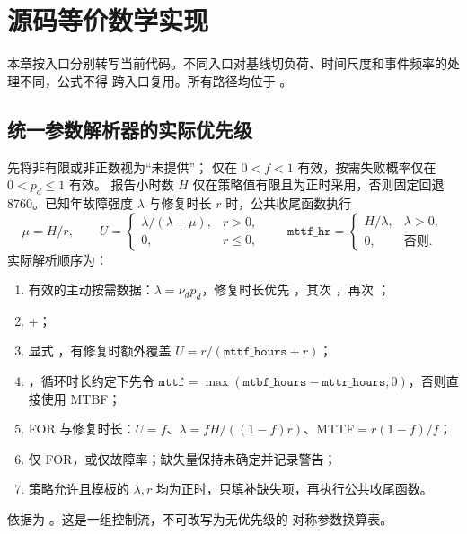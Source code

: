 \section{源码等价数学实现}\label{sec:rel-source-model}

本章按入口分别转写当前代码。不同入口对基线切负荷、时间尺度和事件频率的处理不同，公式不得
跨入口复用。所有路径均位于 。

\subsection{统一参数解析器的实际优先级}

 先将非有限或非正数视为“未提供”；
 仅在 $0<f<1$ 有效，按需失败概率仅在 $0<p_d\le1$ 有效。
报告小时数 $H$ 仅在策略值有限且为正时采用，否则固定回退 8760。已知年故障强度
$\lambda$ 与修复时长 $r$ 时，公共收尾函数执行
\begin{equation}
 \mu=H/r,\qquad U=\begin{cases}\lambda/(\lambda+\mu),&r>0,\\0,&r\le0,
 \end{cases}\qquad \texttt{mttf\_hr}=\begin{cases}H/\lambda,&\lambda>0,\\0,&\text{否则}.
 \end{cases}
\end{equation}
实际解析顺序为：
\begin{enumerate}
 \item 有效的主动按需数据：$\lambda=\nu_dp_d$，修复时长优先
 ，其次 ，再次 ；
 \item {}+；
 \item 显式 ，有修复时额外覆盖 $U=r/(\texttt{mttf\_hours}+r)$；
 \item {}，循环时长约定下先令
 $\texttt{mttf}=\max(\texttt{mtbf\_hours}-\texttt{mttr\_hours},0)$，否则直接使用 MTBF；
 \item FOR 与修复时长：$U=f$、$\lambda=fH/((1-f)r)$、MTTF$=r(1-f)/f$；
 \item 仅 FOR，或仅故障率；缺失量保持未确定并记录警告；
 \item 策略允许且模板的 $\lambda,r$ 均为正时，只填补缺失项，再执行公共收尾函数。
\end{enumerate}
依据为 。这是一组控制流，不可改写为无优先级的
对称参数换算表。

